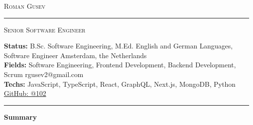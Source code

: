 \documentclass[10pt,A4]{article}
\newcommand{\cvsection}[1]
{
	\begin{center}
		\large\textcolor{sectcol}{\textbf{#1}}
	\end{center}
}
\newcommand{\metasection}[2]
{
    \footnotesize{#2} \hspace*{\fill} \footnotesize{#1}\\[1pt]
}
\begin{document}
\pagestyle{fancy}	








\vspace{-8pt}
\begin{center}
	\huge \textsc{Roman Gusev} \textcolor{sectcol}{\rule[-1mm]{1mm}{0.75cm}} \textsc{Senior Software Engineer}\\[2pt]
\end{center}

\vspace{6pt}

\metasection{Amsterdam, the Netherlands}{\textbf{Status:} B.Sc. Software Engineering, M.Ed. English and German Languages, Software Engineer}
\metasection{rgusev2@gmail.com}{\textbf{Fields:} Software Engineering, Frontend Development, Backend Development, Scrum} 
\metasection{\href{https://github.com/102}{GitHub: @102}}{\textbf{Techs:} JavaScript, TypeScript, React, GraphQL, Next.js, MongoDB, Python}
\vspace{-2pt}
\textcolor{softcol}{\hrule}
\vspace{6pt}

\normalsize

\vspace{-6pt}
\cvsection{Summary}
\vspace{-6pt}
\end{document}
